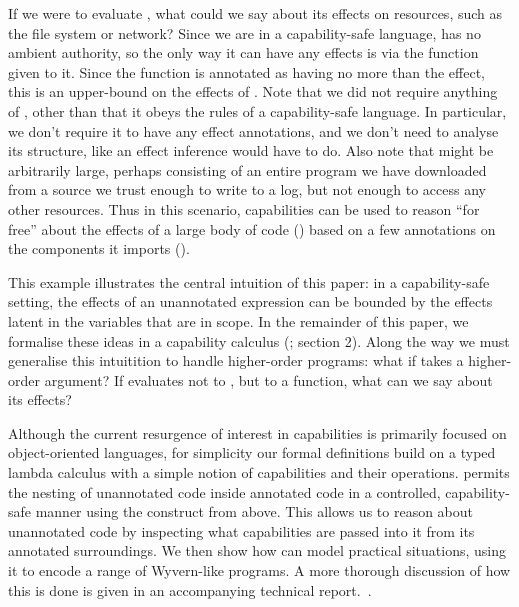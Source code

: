 If we were to evaluate , what could we say about its effects on resources, such as the file system or network? Since we are in a capability-safe language,  has no ambient authority, so the only way it can have any effects is via the  function given to it. Since the  function is annotated as having no more than the  effect, this is an upper-bound on the effects of . Note that we did not require anything of , other than that it obeys the rules of a capability-safe language. In particular, we don't require it to have any effect annotations, and we don't need to analyse its structure, like an effect inference would have to do. Also note that  might be arbitrarily large, perhaps consisting of an entire program we have downloaded from a source we trust enough to write to a log, but not enough to access any other resources. Thus in this scenario, capabilities can be used to reason ``for free'' about the effects of a large body of code () based on a few annotations on the components it imports ().

This example illustrates the central intuition of this paper: in a capability-safe setting,
the effects of an unannotated expression can be bounded by the effects latent in the
variables that are in scope. In the remainder of this paper, we formalise these ideas in a capability calculus (; section 2). Along the way we must generalise this intuitition to handle higher-order programs: what if  takes a higher-order argument? If  evaluates not to , but to a function, what can we say about its effects?

Although the current resurgence of interest in capabilities is primarily focused on object-oriented languages, for simplicity our formal definitions build on a typed lambda calculus with a simple notion of capabilities and their operations.  permits the nesting of unannotated code inside annotated code in a controlled, capability-safe manner using the  construct from above. This allows us to reason about unannotated code by inspecting what capabilities are passed into it from its annotated surroundings. We then show how  can model practical situations, using it to encode a range of Wyvern-like programs. A more thorough discussion of how this is done is given in an accompanying technical report.~\cite{ecs:2018:aaron-tr}.

